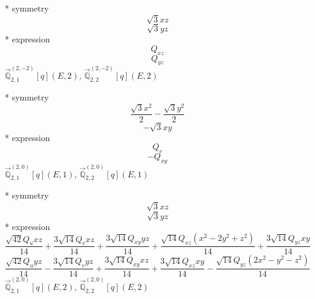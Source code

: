 \documentclass[fleqn,8pt]{jsarticle}
\begin{document}
\noindent\quad ** symmetry
\begin{dmath*}
\sqrt{3} x z
\end{dmath*}
\begin{dmath*}
\sqrt{3} y z
\end{dmath*}
\noindent\quad ** expression
\begin{dmath*}
Q_{xz}
\end{dmath*}
\begin{dmath*}
Q_{yz}
\end{dmath*}
\noindent\quad $\vec{\mathbb{Q}}_{2,1}^{(2,-2)}[q](E,2)$, $\vec{\mathbb{Q}}_{2,2}^{(2,-2)}[q](E,2)$

\noindent\quad ** symmetry
\begin{dmath*}
\frac{\sqrt{3} x^{2}}{2} - \frac{\sqrt{3} y^{2}}{2}
\end{dmath*}
\begin{dmath*}
- \sqrt{3} x y
\end{dmath*}
\noindent\quad ** expression
\begin{dmath*}
Q_{v}
\end{dmath*}
\begin{dmath*}
- Q_{xy}
\end{dmath*}
\noindent\quad $\vec{\mathbb{Q}}_{2,1}^{(2,0)}[q](E,1)$, $\vec{\mathbb{Q}}_{2,2}^{(2,0)}[q](E,1)$

\noindent\quad ** symmetry
\begin{dmath*}
\sqrt{3} x z
\end{dmath*}
\begin{dmath*}
\sqrt{3} y z
\end{dmath*}
\noindent\quad ** expression
\begin{dmath*}
\frac{\sqrt{42} Q_{u} x z}{14} + \frac{3 \sqrt{14} Q_{v} x z}{14} + \frac{3 \sqrt{14} Q_{xy} y z}{14} + \frac{\sqrt{14} Q_{xz} \left(x^{2} - 2 y^{2} + z^{2}\right)}{14} + \frac{3 \sqrt{14} Q_{yz} x y}{14}
\end{dmath*}
\begin{dmath*}
\frac{\sqrt{42} Q_{u} y z}{14} - \frac{3 \sqrt{14} Q_{v} y z}{14} + \frac{3 \sqrt{14} Q_{xy} x z}{14} + \frac{3 \sqrt{14} Q_{xz} x y}{14} - \frac{\sqrt{14} Q_{yz} \left(2 x^{2} - y^{2} - z^{2}\right)}{14}
\end{dmath*}
\noindent\quad $\vec{\mathbb{Q}}_{2,1}^{(2,0)}[q](E,2)$, $\vec{\mathbb{Q}}_{2,2}^{(2,0)}[q](E,2)$
\end{document}

